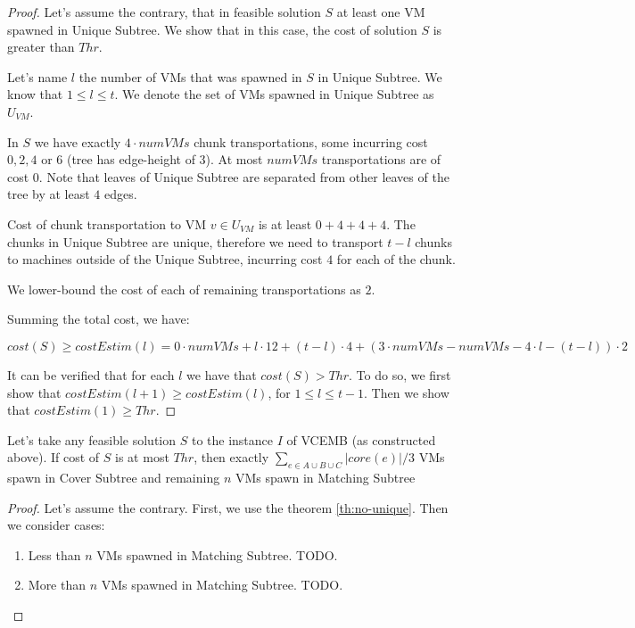 \begin{proof}
  Let's assume the contrary, that in feasible solution $S$ at least
  one VM spawned in Unique
  Subtree. We show that in this case, the cost of solution $S$ is
  greater than $Thr$. 

  Let's name $l$ the number of VMs that was spawned in $S$ in Unique
  Subtree. We know that $1 \leq l \leq t$. We denote the set of VMs
  spawned in Unique Subtree as $U_{VM}$.

In $S$ we have exactly
  $4 \cdot numVMs$ chunk transportations, some incurring cost $0, 2,
  4$ or $6$ (tree has edge-height of $3$). At most $numVMs$
  transportations are of cost $0$. Note that leaves of Unique Subtree
  are separated from other leaves of the tree by at least $4$ edges. 

  Cost of chunk transportation to VM $v \in U_{VM}$ is at least $0 + 4
  + 4 + 4$. The chunks in Unique Subtree are unique, therefore we need
  to transport $t - l$ chunks to machines outside of the Unique
  Subtree, incurring cost $4$ for each of the chunk.

  We lower-bound the cost of each of remaining transportations as $2$.

Summing the total cost, we have:

$cost(S) \geq costEstim(l) = 0 \cdot numVMs + l \cdot 12 + (t-l)\cdot 4 +
(3\cdot numVMs - numVMs - 4\cdot l - (t-l))\cdot 2$

It can be verified that for each $l$ we have that $cost(S) > Thr$. To
do so, we first show that $costEstim(l+1) \geq costEstim(l)$, for
$1\leq l \leq t-1$. Then we show that $costEstim(1) \geq Thr$.
\end{proof}

\begin{theorem}
  Let's take any feasible solution $S$ to the instance $I$ of VCEMB
  (as constructed above). If cost of $S$ is at most $Thr$, then
  exactly $\sum_{e\in A\cup B\cup C}|core(e)|/3$ VMs spawn in Cover
  Subtree and remaining $n$ VMs spawn in Matching Subtree
\end{theorem}

\begin{proof}
  Let's assume the contrary. First, we use the theorem
  \ref{th:no-unique}. Then we consider cases:
  \begin{enumerate}
    \item Less than $n$ VMs spawned in Matching Subtree. TODO.
    \item More than $n$ VMs spawned in Matching Subtree. TODO.
  \end{enumerate}
\end{proof}

